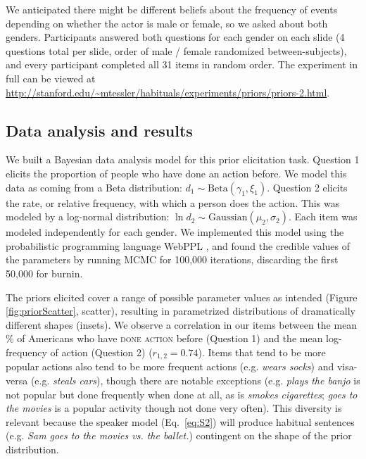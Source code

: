 \documentclass[11pt,letterpaper]{article}
\begin{document}
We anticipated there might be different beliefs about the frequency of events depending on whether the actor is male or female, so we asked about both genders. Participants answered both questions for each gender on each slide (4 questions total per slide, order of male / female randomized between-subjects), and every participant completed all 31 items in random order.
The experiment in full can be viewed at \url{http://stanford.edu/~mtessler/habituals/experiments/priors/priors-2.html}.

\subsection{Data analysis and results}
We built a Bayesian data analysis model for this prior elicitation task.
Question 1 elicits the proportion of people who have done an action before. 
We model this data as coming from a Beta distribution: $d_{1} \sim \text{Beta}(\gamma_{1}, \xi_{1})$. 
Question 2 elicits the rate, or relative frequency, with which a person does the action.
This was modeled by a log-normal distribution: $\ln d_{2} \sim \text{Gaussian}(\mu_{2}, \sigma_{2})$. 
Each item was modeled independently for each gender.
We implemented this model using the probabilistic programming language WebPPL \cite{dippl}, and found the credible values of the parameters by running MCMC for 100,000 iterations, discarding the first 50,000 for burnin.

The priors elicited cover a range of possible parameter values as intended (Figure \ref{fig:priorScatter}, scatter), resulting in parametrized distributions of dramatically different shapes (insets).  
We observe a correlation in our items between the mean \% of Americans who have \textsc{done action} before (Question 1) and the mean log-frequency  of action (Question 2) ($r_{1,2} = 0.74$).
Items that tend to be more popular actions also tend to be more frequent actions (e.g. \emph{wears socks}) and visa-versa (e.g. \emph{steals cars}), though there are notable exceptions (e.g. \emph{plays the banjo} is not popular but done frequently when done at all, as is \emph{smokes cigarettes}; \emph{goes to the movies} is a popular activity though not done very often). 
This diversity is relevant because the speaker model (Eq.~\ref{eq:S2}) will produce habitual sentences (e.g. \emph{Sam goes to the movies vs. the ballet.}) contingent on the shape of the prior distribution. 
\end{document}
